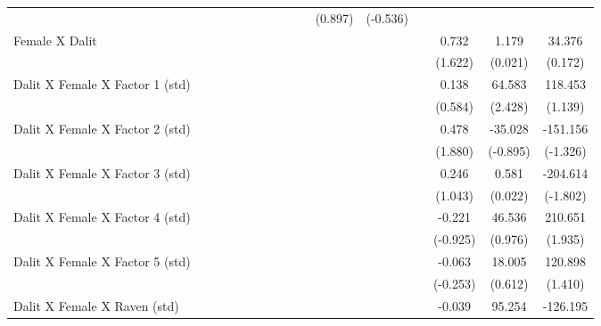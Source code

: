 {\begin{longtable}{@{\extracolsep{\fill}}lccccccccccccccc}
          &       &       &       &       &       &       &       &       &       & (0.897) & (-0.536) &       &       &       &  \\
    Female X Dalit &       &       &       &       &       &       &       &       &       &       &       &       & 0.732 & 1.179 & 34.376 \\
          &       &       &       &       &       &       &       &       &       &       &       &       & (1.622) & (0.021) & (0.172) \\
    Dalit X Female X Factor 1 (std) &       &       &       &       &       &       &       &       &       &       &       &       & 0.138 & 64.583 & 118.453 \\
          &       &       &       &       &       &       &       &       &       &       &       &       & (0.584) & (2.428) & (1.139) \\
    Dalit X Female X Factor 2 (std) &       &       &       &       &       &       &       &       &       &       &       &       & 0.478 & -35.028 & -151.156 \\
          &       &       &       &       &       &       &       &       &       &       &       &       & (1.880) & (-0.895) & (-1.326) \\
    Dalit X Female X Factor 3 (std) &       &       &       &       &       &       &       &       &       &       &       &       & 0.246 & 0.581 & -204.614 \\
          &       &       &       &       &       &       &       &       &       &       &       &       & (1.043) & (0.022) & (-1.802) \\
    Dalit X Female X Factor 4 (std) &       &       &       &       &       &       &       &       &       &       &       &       & -0.221 & 46.536 & 210.651 \\
          &       &       &       &       &       &       &       &       &       &       &       &       & (-0.925) & (0.976) & (1.935) \\
    Dalit X Female X Factor 5 (std) &       &       &       &       &       &       &       &       &       &       &       &       & -0.063 & 18.005 & 120.898 \\
          &       &       &       &       &       &       &       &       &       &       &       &       & (-0.253) & (0.612) & (1.410) \\
    Dalit X Female X Raven (std) &       &       &       &       &       &       &       &       &       &       &       &       & -0.039 & 95.254 & -126.195 \\

\end{longtable}}
